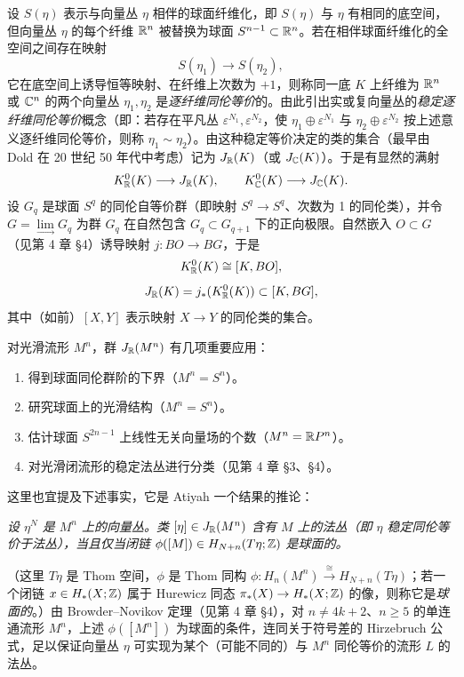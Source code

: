 设 $S(\eta)$ 表示与向量丛 $\eta$ 相伴的球面纤维化，即 $S(\eta)$ 与 $\eta$ 有相同的底空间，但向量丛 $\eta$ 的每个纤维 $\mathbb{R}^n$ 被替换为球面 $S^{n-1}\subset\mathbb{R}^n$。若在相伴球面纤维化的全空间之间存在映射
\[
S(\eta_1)\longrightarrow S(\eta_2),
\]
它在底空间上诱导恒等映射、在纤维上次数为 $+1$，则称同一底 $K$ 上纤维为 $\mathbb{R}^n$ 或 $\mathbb{C}^n$ 的两个向量丛 $\eta_1,\eta_2$ 是\emph{逐纤维同伦等价}的。由此引出实或复向量丛的\emph{稳定逐纤维同伦等价}概念（即：若存在平凡丛 $\varepsilon^{N_1},\varepsilon^{N_2}$，使 $\eta_1\oplus\varepsilon^{N_1}$ 与 $\eta_2\oplus\varepsilon^{N_2}$ 按上述意义逐纤维同伦等价，则称 $\eta_1\sim\eta_2$）。由这种稳定等价决定的类的集合（最早由 Dold 在 20 世纪 50 年代中考虑）记为 $J_{\mathbb{R}}(K)$（或 $J_{\mathbb{C}}(K)$）。于是有显然的满射
\[
K_{\mathbb{R}}^0(K)\longrightarrow J_{\mathbb{R}}(K),\qquad K_{\mathbb{C}}^0(K)\longrightarrow J_{\mathbb{C}}(K).
\]
设 $G_q$ 是球面 $S^q$ 的同伦自等价群（即映射 $S^q\to S^q$、次数为 1 的同伦类），并令 $G=\lim\limits_{\longrightarrow}G_q$ 为群 $G_q$ 在自然包含 $G_q\subset G_{q+1}$ 下的正向极限。自然嵌入 $O\subset G$（见第 4 章 §4）诱导映射 $j:BO\to BG$，于是
\[
K_{\mathbb{R}}^0(K)\cong[K,BO],
\]
\[
J_{\mathbb{R}}(K)=j_*(K_{\mathbb{R}}^0(K))\subset[K,BG],
\]
其中（如前）$[X,Y]$ 表示映射 $X\to Y$ 的同伦类的集合。

对光滑流形 $M^n$，群 $J_{\mathbb{R}}(M^n)$ 有几项重要应用：
\begin{enumerate}[label=\arabic*.,leftmargin=2em]
\item 得到球面同伦群阶的下界（$M^n=S^n$）。
\item 研究球面上的光滑结构（$M^n=S^n$）。
\item 估计球面 $S^{2n-1}$ 上线性无关向量场的个数（$M^n=\mathbb{R}P^n$）。
\item 对光滑闭流形的稳定法丛进行分类（见第 4 章 §3、§4）。
\end{enumerate}
这里也宜提及下述事实，它是 Atiyah 一个结果的推论：

\noindent\emph{设 $\eta^N$ 是 $M^n$ 上的向量丛。类 $[\eta]\in J_{\mathbb{R}}(M^n)$ 含有 $M$ 上的法丛（即 $\eta$ 稳定同伦等价于法丛），当且仅当闭链 $\phi([M])\in H_{N+n}(T\eta;\mathbb{Z})$ 是球面的。}

（这里 $T\eta$ 是 Thom 空间，$\phi$ 是 Thom 同构 $\phi:H_n(M^n)\xrightarrow{\ \cong\ }H_{N+n}(T\eta)$；若一个闭链 $x\in H_*(X;\mathbb{Z})$ 属于 Hurewicz 同态 $\pi_*(X)\to H_*(X;\mathbb{Z})$ 的像，则称它是\emph{球面的}。）由 Browder--Novikov 定理（见第 4 章 §4），对 $n\ne4k+2$、$n\ge5$ 的单连通流形 $M^n$，上述 $\phi([M^n])$ 为球面的条件，连同关于符号差的 Hirzebruch 公式，足以保证向量丛 $\eta$ 可实现为某个（可能不同的）与 $M^n$ 同伦等价的流形 $L$ 的法丛。

